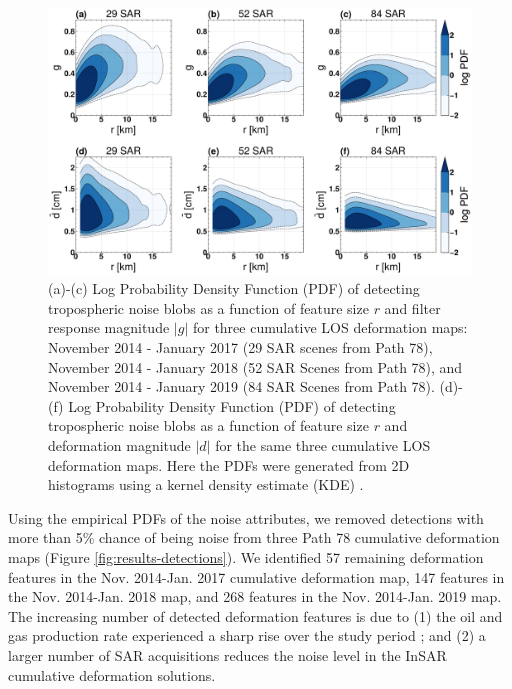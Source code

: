 	
	
	\begin{figure}[hbt!]
		\centering 
		\includegraphics[width=0.98\linewidth]{paper2/figures/figure_results_kde.pdf}
		\caption[Estimates of empirical tropospheric noise probability density]{ (a)-(c) Log Probability Density Function (PDF) of detecting tropospheric noise blobs as a function of feature size $r$ and filter response magnitude $|g|$ for three cumulative LOS deformation maps: November 2014 - January 2017 (29 SAR scenes from Path 78), November 2014 - January 2018 (52 SAR Scenes from Path 78), and November 2014 - January 2019 (84 SAR Scenes from Path 78).
			(d)-(f) Log Probability Density Function (PDF) of detecting tropospheric noise blobs as a function of feature size $r$ and deformation magnitude $|d|$ for the same three cumulative LOS deformation maps.
			Here the PDFs were generated from 2D histograms using a kernel density estimate (KDE) \cite{Scott2015MultivariateDensityEstimation}.
		}
		\label{fig:results-kde}
	\end{figure}
	
	
	
	
	Using the empirical PDFs of the noise attributes, we removed detections with more than 5\% chance of being noise from three Path 78 cumulative deformation maps (Figure \ref{fig:results-detections}). We identified 57 remaining deformation features in the Nov. 2014-Jan. 2017 cumulative deformation map, 147 features in the Nov. 2014-Jan. 2018 map, and 268 features in the Nov. 2014-Jan. 2019 map. The increasing number of detected deformation features is due to (1) the oil and gas production rate experienced a sharp rise over the study period \cite{Staniewicz2020InsarRevealsComplex}; and (2) a larger number of SAR acquisitions reduces the noise level in the InSAR cumulative deformation solutions.
	
